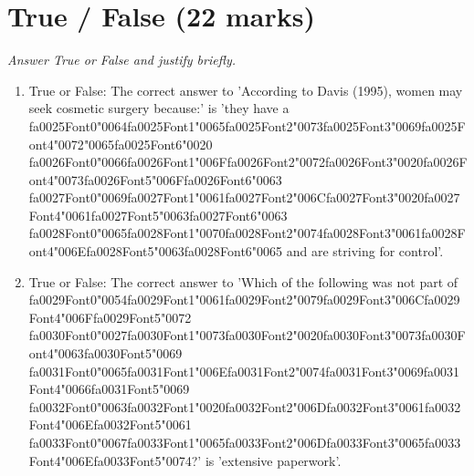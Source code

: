 \documentclass[12pt]{article}
\begin{document}
\section*{True / False (22 marks)}
\textit{Answer True or False and justify briefly.}
\begin{enumerate}[label=\arabic*.]
\item True or False: The correct answer to 'According to Davis (1995), women may seek cosmetic surgery because:' is 'they have a {\csname fa0025Font0\endcsname\char"0064}{\csname fa0025Font1\endcsname\char"0065}{\csname fa0025Font2\endcsname\char"0073}{\csname fa0025Font3\endcsname\char"0069}{\csname fa0025Font4\endcsname\char"0072}{\char"0065}{\csname fa0025Font6\endcsname\char"0020} {\csname fa0026Font0\endcsname\char"0066}{\csname fa0026Font1\endcsname\char"006F}{\csname fa0026Font2\endcsname\char"0072}{\csname fa0026Font3\endcsname\char"0020}{\csname fa0026Font4\endcsname\char"0073}{\csname fa0026Font5\endcsname\char"006F}{\csname fa0026Font6\endcsname\char"0063} {\csname fa0027Font0\endcsname\char"0069}{\csname fa0027Font1\endcsname\char"0061}{\csname fa0027Font2\endcsname\char"006C}{\csname fa0027Font3\endcsname\char"0020}{\csname fa0027Font4\endcsname\char"0061}{\csname fa0027Font5\endcsname\char"0063}{\csname fa0027Font6\endcsname\char"0063} {\csname fa0028Font0\endcsname\char"0065}{\csname fa0028Font1\endcsname\char"0070}{\csname fa0028Font2\endcsname\char"0074}{\csname fa0028Font3\endcsname\char"0061}{\csname fa0028Font4\endcsname\char"006E}{\csname fa0028Font5\endcsname\char"0063}{\csname fa0028Font6\endcsname\char"0065} and are striving for control'.
\item True or False: The correct answer to 'Which of the following was not part of {\csname fa0029Font0\endcsname\char"0054}{\csname fa0029Font1\endcsname\char"0061}{\csname fa0029Font2\endcsname\char"0079}{\csname fa0029Font3\endcsname\char"006C}{\csname fa0029Font4\endcsname\char"006F}{\csname fa0029Font5\endcsname\char"0072} {\csname fa0030Font0\endcsname\char"0027}{\csname fa0030Font1\endcsname\char"0073}{\csname fa0030Font2\endcsname\char"0020}{\csname fa0030Font3\endcsname\char"0073}{\csname fa0030Font4\endcsname\char"0063}{\csname fa0030Font5\endcsname\char"0069} {\csname fa0031Font0\endcsname\char"0065}{\csname fa0031Font1\endcsname\char"006E}{\csname fa0031Font2\endcsname\char"0074}{\csname fa0031Font3\endcsname\char"0069}{\csname fa0031Font4\endcsname\char"0066}{\csname fa0031Font5\endcsname\char"0069} {\csname fa0032Font0\endcsname\char"0063}{\csname fa0032Font1\endcsname\char"0020}{\csname fa0032Font2\endcsname\char"006D}{\csname fa0032Font3\endcsname\char"0061}{\csname fa0032Font4\endcsname\char"006E}{\csname fa0032Font5\endcsname\char"0061} {\csname fa0033Font0\endcsname\char"0067}{\csname fa0033Font1\endcsname\char"0065}{\csname fa0033Font2\endcsname\char"006D}{\csname fa0033Font3\endcsname\char"0065}{\csname fa0033Font4\endcsname\char"006E}{\csname fa0033Font5\endcsname\char"0074}?' is 'extensive paperwork'.

\end{enumerate}
\end{document}
